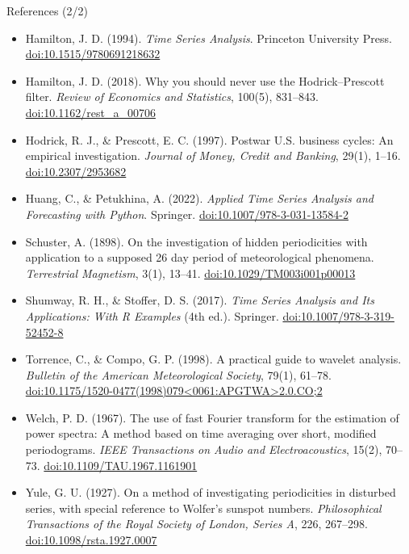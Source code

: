 \begin{frame}{References (2/2)}
\itemsize{\scriptsize}
\begin{itemize}
    \item Hamilton, J. D. (1994). \textit{Time Series Analysis}. Princeton University Press. \href{https://doi.org/10.1515/9780691218632}{doi:10.1515/9780691218632}
    \item Hamilton, J. D. (2018). Why you should never use the Hodrick--Prescott filter. \textit{Review of Economics and Statistics}, 100(5), 831--843. \href{https://doi.org/10.1162/rest_a_00706}{doi:10.1162/rest\_a\_00706}
    \item Hodrick, R. J., \& Prescott, E. C. (1997). Postwar U.S. business cycles: An empirical investigation. \textit{Journal of Money, Credit and Banking}, 29(1), 1--16. \href{https://doi.org/10.2307/2953682}{doi:10.2307/2953682}
    \item Huang, C., \& Petukhina, A. (2022). \textit{Applied Time Series Analysis and Forecasting with Python}. Springer. \href{https://doi.org/10.1007/978-3-031-13584-2}{doi:10.1007/978-3-031-13584-2}
    \item Schuster, A. (1898). On the investigation of hidden periodicities with application to a supposed 26 day period of meteorological phenomena. \textit{Terrestrial Magnetism}, 3(1), 13--41. \href{https://doi.org/10.1029/TM003i001p00013}{doi:10.1029/TM003i001p00013}
    \item Shumway, R. H., \& Stoffer, D. S. (2017). \textit{Time Series Analysis and Its Applications: With R Examples} (4th ed.). Springer. \href{https://doi.org/10.1007/978-3-319-52452-8}{doi:10.1007/978-3-319-52452-8}
    \item Torrence, C., \& Compo, G. P. (1998). A practical guide to wavelet analysis. \textit{Bulletin of the American Meteorological Society}, 79(1), 61--78. \href{https://doi.org/10.1175/1520-0477(1998)079<0061:APGTWA>2.0.CO;2}{doi:10.1175/1520-0477(1998)079<0061:APGTWA>2.0.CO;2}
    \item Welch, P. D. (1967). The use of fast Fourier transform for the estimation of power spectra: A method based on time averaging over short, modified periodograms. \textit{IEEE Transactions on Audio and Electroacoustics}, 15(2), 70--73. \href{https://doi.org/10.1109/TAU.1967.1161901}{doi:10.1109/TAU.1967.1161901}
    \item Yule, G. U. (1927). On a method of investigating periodicities in disturbed series, with special reference to Wolfer's sunspot numbers. \textit{Philosophical Transactions of the Royal Society of London, Series A}, 226, 267--298. \href{https://doi.org/10.1098/rsta.1927.0007}{doi:10.1098/rsta.1927.0007}
\end{itemize}
\end{frame}



